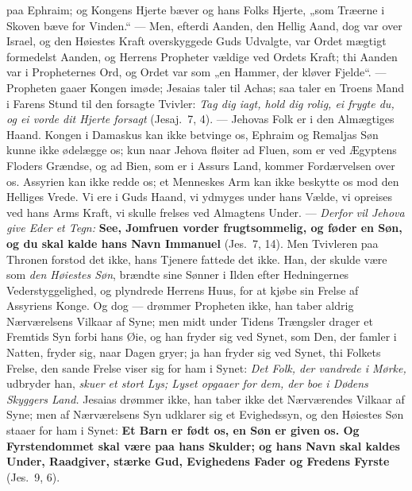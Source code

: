 \documentclass[12pt,a4paper]{book}
\begin{document}
paa Ephraim; og Kongens Hjerte bæver og hans Folks Hjerte, „som Træerne i Skoven
bæve for Vinden.“ --- Men, efterdi Aanden, den Hellig Aand, dog var over Israel,
og den Høiestes Kraft overskyggede Guds Udvalgte, var Ordet mægtigt formedelst
Aanden, og Herrens Propheter vældige ved Ordets Kraft; thi Aanden var i
Propheternes Ord, og Ordet var som „en Hammer, der kløver Fjelde“. --- Propheten
gaaer Kongen imøde; Jesaias taler til Achas; saa taler en Troens Mand i Farens
Stund til den forsagte Tvivler: \emph{Tag dig iagt, hold dig rolig, ei frygte
du, og ei vorde dit Hjerte forsagt} (Jesaj.\ 7, 4). --- Jehovas Folk er i den
Almægtiges Haand. Kongen i Damaskus kan
ikke betvinge os, Ephraim og Remaljas Søn kunne ikke ødelægge os; kun naar
Jehova fløiter ad Fluen, som er ved Ægyptens Floders Grændse, og ad Bien, som er
i Assurs Land, kommer Fordærvelsen over os. Assyrien kan ikke redde os; et
Menneskes Arm kan ikke beskytte os mod den Helliges Vrede. Vi ere i Guds Haand,
vi ydmyges under hans Vælde, vi opreises ved hans Arms Kraft, vi skulle frelses
ved Almagtens Under. --- \emph{Derfor vil Jehova give Eder et Tegn:}
\textbf{See, Jomfruen vorder frugtsommelig, og føder en Søn, og du skal kalde
hans Navn Immanuel} (Jes.\ 7, 14). Men Tvivleren paa Thronen forstod det ikke,
hans Tjenere fattede det ikke. Han, der skulde være som \emph{den Høiestes Søn},
brændte sine Sønner i Ilden efter Hedningernes Vederstyggelighed, og plyndrede
Herrens Huus, for at kjøbe sin Frelse af Assyriens Konge. Og dog --- drømmer
Propheten ikke, han taber aldrig Nærværelsens Vilkaar af Syne; men midt under
Tidens Trængsler drager et Fremtids Syn forbi hans Øie, og han fryder sig ved
Synet, som Den, der famler i Natten, fryder sig, naar Dagen gryer; ja han fryder
sig ved Synet, thi Folkets Frelse, den sande Frelse viser sig for ham i Synet:
\emph{Det Folk, der vandrede i Mørke,} udbryder han, \emph{skuer et stort Lys;
Lyset opgaaer for dem, der boe i Dødens Skyggers Land.} Jesaias drømmer ikke,
han taber ikke det Nærværendes Vilkaar af Syne; men af Nærværelsens Syn udklarer
sig et Evighedssyn, og den Høiestes Søn staaer for ham i Synet: \textbf{Et Barn
er født os, en Søn er given os. Og Fyrstendommet skal være paa hans Skulder; og
hans Navn skal kaldes Under, Raadgiver, stærke Gud, Evighedens Fader og Fredens
Fyrste} (Jes.\ 9, 6).
\end{document}
